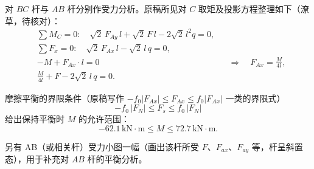 \begin{solution}
对 $BC$ 杆与 $AB$ 杆分别作受力分析。原稿所见对 $C$ 取矩及投影方程整理如下（潦草，待核对）：
\begin{equation}\label{eq:A2-equilib}
\begin{aligned}
&\sum M_C=0:\quad \sqrt{2}\,F_{Ay}\,l+\sqrt{2}\,F\,l-2\sqrt{2}\,l^{2}q=0,\\[2pt]
&\sum F_x=0:\quad \sqrt{2}\,F_{Ax}\,l-\sqrt{2}\,l\,q=0,\\[2pt]
&-M+F_{Ax}\cdot l=0
&&\Longrightarrow\quad F_{Ax}=\frac{M}{4l},\\[2pt]
&\frac{M}{4l}+F-2\sqrt{2}\,l\,q=0.
\end{aligned}
\end{equation}%

摩擦平衡的界限条件（原稿写作 $-f_0|F_{Ax}|\le F_{Ax}\le f_0|F_{Ax}|$ 一类的界限式）
\begin{equation}\label{eq:A2-friction}
-f_0\,|F_N|\le F_s\le f_0\,|F_N|
\end{equation}%
给出保持平衡时 $M$ 的允许范围：
\begin{equation}\label{eq:A2-result}
-62.1\,\mathrm{kN\cdot m}\le M\le 72.7\,\mathrm{kN\cdot m}.
\end{equation}%

另有 AB（或相关杆）受力小图一幅（画出该杆所受 $F$、$F_{ax}$、$F_{ay}$ 等，杆呈斜置态），用于补充对 $AB$ 杆的平衡分析。
\end{solution}

